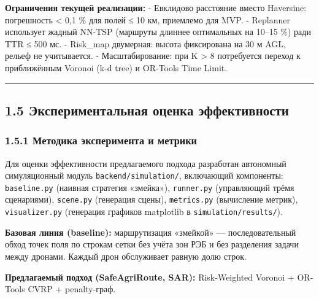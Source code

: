 \textbf{Ограничения текущей реализации:} - Евклидово расстояние вместо Haversine: погрешность \textless{} 0,1 \% для полей ≤ 10 км, приемлемо для MVP. - Replanner использует жадный NN-TSP (маршруты длиннее оптимальных на 10--15 \%) ради TTR ≤ 500 мс. - Risk\_map двумерная: высота фиксирована на 30 м AGL, рельеф не учитывается. - Масштабирование: при K \textgreater{} 8 потребуется переход к приближённым Voronoi (k-d tree) и OR-Tools Time Limit.

\begin{center}\rule{0.5\linewidth}{0.5pt}\end{center}

\hypertarget{ux44dux43aux441ux43fux435ux440ux438ux43cux435ux43dux442ux430ux43bux44cux43dux430ux44f-ux43eux446ux435ux43dux43aux430-ux44dux444ux444ux435ux43aux442ux438ux432ux43dux43eux441ux442ux438}{%
\subsection{1.5 Экспериментальная оценка эффективности}\label{ux44dux43aux441ux43fux435ux440ux438ux43cux435ux43dux442ux430ux43bux44cux43dux430ux44f-ux43eux446ux435ux43dux43aux430-ux44dux444ux444ux435ux43aux442ux438ux432ux43dux43eux441ux442ux438}}

\hypertarget{ux43cux435ux442ux43eux434ux438ux43aux430-ux44dux43aux441ux43fux435ux440ux438ux43cux435ux43dux442ux430-ux438-ux43cux435ux442ux440ux438ux43aux438}{%
\subsubsection{1.5.1 Методика эксперимента и метрики}\label{ux43cux435ux442ux43eux434ux438ux43aux430-ux44dux43aux441ux43fux435ux440ux438ux43cux435ux43dux442ux430-ux438-ux43cux435ux442ux440ux438ux43aux438}}

Для оценки эффективности предлагаемого подхода разработан автономный симуляционный модуль \texttt{backend/simulation/}, включающий компоненты: \texttt{baseline.py} (наивная стратегия «змейка»), \texttt{runner.py} (управляющий трёмя сценариями), \texttt{scene.py} (генерация сцены), \texttt{metrics.py} (вычисление метрик), \texttt{visualizer.py} (генерация графиков matplotlib в \texttt{simulation/results/}).

\textbf{Базовая линия (baseline):} маршрутизация «змейкой» --- последовательный обход точек поля по строкам сетки без учёта зон РЭБ и без разделения задачи между дронами. Каждый дрон обслуживает равную долю строк.

\textbf{Предлагаемый подход (SafeAgriRoute, SAR):} Risk-Weighted Voronoi + OR-Tools CVRP + penalty-граф.

